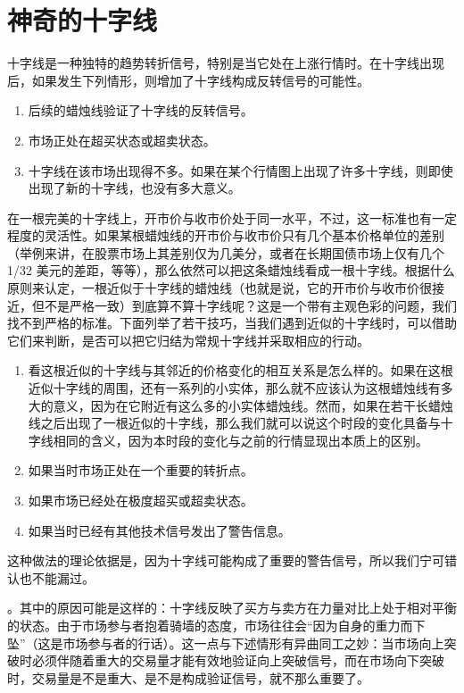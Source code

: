 \chapter{神奇的十字线}
十字线是一种独特的趋势转折信号，特别是当它处在上涨行情时。在十字线出现后，如果发生下列情形，则增加了十字线构成反转信号的可能性。

\begin{enumerate}
    \item 后续的蜡烛线验证了十字线的反转信号。
    \item 市场正处在超买状态或超卖状态。
    \item 十字线在该市场出现得不多。如果在某个行情图上出现了许多十字线，则即使出现了新的十字线，也没有多大意义。
\end{enumerate}

在一根完美的十字线上，开市价与收市价处于同一水平，不过，这一标准也有一定程度的灵活性。如果某根蜡烛线的开市价与收市价只有几个基本价格单位的差别（举例来讲，在股票市场上其差别仅为几美分，或者在长期国债市场上仅有几个 1/32 美元的差距，等等），那么依然可以把这条蜡烛线看成一根十字线。根据什么原则来认定，一根近似于十字线的蜡烛线（也就是说，它的开市价与收市价很接近，但不是严格一致）到底算不算十字线呢？这是一个带有主观色彩的问题，我们找不到严格的标准。下面列举了若干技巧，当我们遇到近似的十字线时，可以借助它们来判断，是否可以把它归结为常规十字线并采取相应的行动。

\begin{enumerate}
    \item 看这根近似的十字线与其邻近的价格变化的相互关系是怎么样的。如果在这根近似十字线的周围，还有一系列的小实体，那么就不应该认为这根蜡烛线有多大的意义，因为在它附近有这么多的小实体蜡烛线。然而，如果在若干长蜡烛线之后出现了一根近似的十字线，那么我们就可以说这个时段的变化具备与十字线相同的含义，因为本时段的变化与之前的行情显现出本质上的区别。
    \item 如果当时市场正处在一个重要的转折点。
    \item 如果市场已经处在极度超买或超卖状态。
    \item 如果当时已经有其他技术信号发出了警告信息。
\end{enumerate}
这种做法的理论依据是，因为十字线可能构成了重要的警告信号，所以我们宁可错认也不能漏过。

。其中的原因可能是这样的：十字线反映了买方与卖方在力量对比上处于相对平衡的状态。由于市场参与者抱着骑墙的态度，市场往往会“因为自身的重力而下坠”（这是市场参与者的行话）。这一点与下述情形有异曲同工之妙：当市场向上突破时必须伴随着重大的交易量才能有效地验证向上突破信号，而在市场向下突破时，交易量是不是重大、是不是构成验证信号，就不那么重要了。

